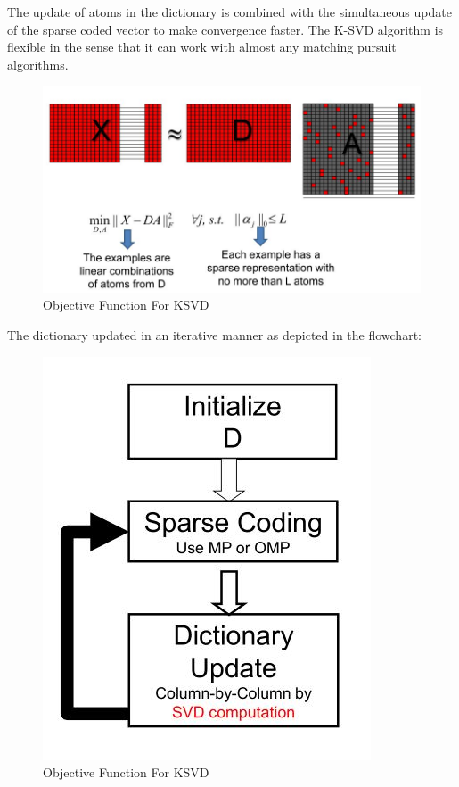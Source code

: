 \documentclass[a4paper, 15pt]{article}
\begin{document}
	\par
	The update of atoms in the dictionary is combined with the simultaneous update of the sparse coded vector to make convergence faster. The K-SVD algorithm is flexible in the sense that it can work with almost any matching pursuit algorithms. 
	\par
	\begin{figure}[h]
		\centering
		\includegraphics[scale=0.5]{KSVD.JPG}
		\caption{Objective Function For KSVD}
		\label{fig:KSVD}
	\end{figure}
	\newpage
	\par
	The dictionary updated in an iterative manner as depicted in the flowchart: 
	\par 
	\begin{figure}[h]
		\centering
		\includegraphics[width=0.35 \textheight]{flowchartksvd.JPG}
		\caption{Objective Function For KSVD}
		\label{fig:flowchartksvd}
	\end{figure}
\end{document}
